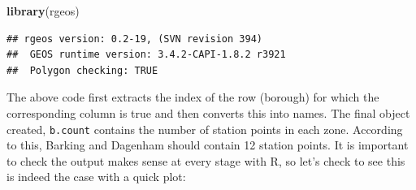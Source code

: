 \documentclass[]{article}
\newenvironment{Shaded}{}{}
\newcommand{\KeywordTok}[1]{\textcolor[rgb]{0.00,0.44,0.13}{\textbf{{#1}}}}
\newcommand{\DataTypeTok}[1]{\textcolor[rgb]{0.56,0.13,0.00}{{#1}}}
\newcommand{\DecValTok}[1]{\textcolor[rgb]{0.25,0.63,0.44}{{#1}}}
\newcommand{\StringTok}[1]{\textcolor[rgb]{0.25,0.44,0.63}{{#1}}}
\newcommand{\CommentTok}[1]{\textcolor[rgb]{0.38,0.63,0.69}{\textit{{#1}}}}
\newcommand{\OtherTok}[1]{\textcolor[rgb]{0.00,0.44,0.13}{{#1}}}
\newcommand{\NormalTok}[1]{{#1}}
\begin{document}
\begin{Shaded}
\begin{Highlighting}[]
\KeywordTok{library}\NormalTok{(rgeos)}
\end{Highlighting}
\end{Shaded}

\begin{verbatim}
## rgeos version: 0.2-19, (SVN revision 394)
##  GEOS runtime version: 3.4.2-CAPI-1.8.2 r3921 
##  Polygon checking: TRUE
\end{verbatim}

\begin{Shaded}
\end{Shaded}

The above code first extracts the index of the row (borough) for which
the corresponding column is true and then converts this into names. The
final object created, \texttt{b.count} contains the number of station
points in each zone. According to this, Barking and Dagenham should
contain 12 station points. It is important to check the output makes
sense at every stage with R, so let's check to see this is indeed the
case with a quick plot:

\begin{Shaded}
\end{Shaded}
\end{document}
